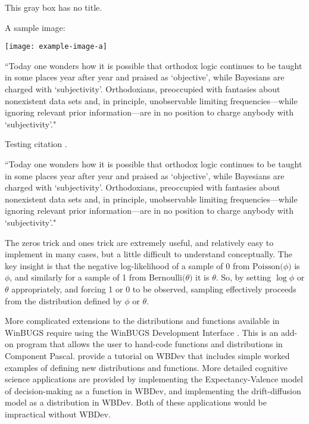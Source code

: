 \documentclass{bayeshyp}
\begin{document}
\begin{graybg}[][h]
  This gray box has no title. \lipsum[2]

  A sample image:

  \texttt{[image: example-image-a]}
\end{graybg}

\begin{graybg}
  ``Today one wonders how it is possible that orthodox logic continues to be
  taught in some places year after year and praised as `objective', while
  Bayesians are charged with `subjectivity'. Orthodoxians, preoccupied with
  fantasies about nonexistent data sets and, in principle, unobservable
  limiting frequencies---while ignoring relevant prior information---are in no
  position to charge anybody with `subjectivity'."\cite{Jaynes2003}
\end{graybg}

Testing citation \cite{Jaynes2003}.

\lipsum

\begin{graybg*}
  ``Today one wonders how it is possible that orthodox logic continues to be
  taught in some places year after year and praised as `objective', while
  Bayesians are charged with `subjectivity'. Orthodoxians, preoccupied with
  fantasies about nonexistent data sets and, in principle, unobservable
  limiting frequencies---while ignoring relevant prior information---are in no
  position to charge anybody with `subjectivity'."\cite{Jaynes2003}
\end{graybg*}

\begin{graybg}
  The zeros trick and ones trick are extremely useful, and relatively easy to
  implement in many cases, but a little difficult to understand conceptually.
  The key insight is that the negative log-likelihood of a sample of 0 from
  $\mathrm{Poisson}\bigl(\phi\bigr)$ is $\phi$, and similarly for a sample of 1
  from $\mathrm{Bernoulli}\bigl(\theta\bigr)$ it is $\theta$. So, by setting
  $\log \phi$ or $\theta$ appropriately, and forcing 1 or 0 to be observed,
  sampling effectively proceeds from the distribution defined by $\phi$ or
  $\theta$.

  More complicated extensions to the distributions and functions available in
  WinBUGS require using the WinBUGS Development Interface
  \cite{Lunn2003}. This is an add-on program that allows the user to
  hand-code functions and distributions in Component Pascal.
  \cite{Abelson1997} provide a tutorial on WBDev that includes
  simple worked examples of defining new distributions and functions. More
  detailed cognitive science applications are provided by
  \cite{AczelEtAl2017} implementing the Expectancy-Valence model of
  decision-making as a function in WBDev, and \cite{VandekerckhoveEtAl2011}
  implementing the drift-diffusion model as a distribution in WBDev. Both of
  these applications would be impractical without WBDev.
\end{graybg}
\end{document}
